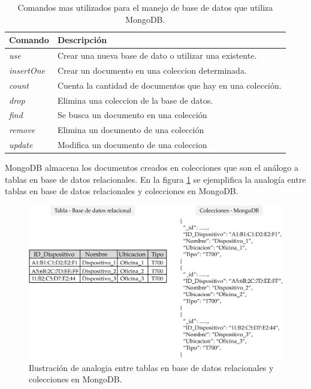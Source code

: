 \begin{table}[h]
	\centering
	\caption[Comandos utilizados en MongoDB]{Comandos mas utilizados para el manejo de base de datos que utiliza MongoDB.}
	\begin{tabular}{l l }    
		\toprule
		\textbf{Comando} 	 & \textbf{Descripción} 		\\
		\midrule
	
		\textit{use} 							& Crear una nueva base de dato o utilizar una existente.\\		
		\textit{insertOne}					& Crear un documento en una coleccion determinada.\\	
		\textit{count}						& Cuenta la cantidad de documentos que hay en una colección.\\	
		\textit{drop}							& Elimina una coleccion de la base de datos.\\	
		\textit{find	} 						& Se busca un documento en una colección\\
		\textit{remove}	 					& Elimina un documento de una colección\\
		\textit{update}						& Modifica un documento de una coleccion\\
		
		\bottomrule
		\hline
	\end{tabular}
	\label{tab:mongo-commands}
\end{table}

MongoDB almacena los documentos creados en colecciones que son el análogo a tablas en base de datos relacionales.  En la figura \ref{fig:tabla-coleccion} se ejemplifica la analogía entre tablas en base de datos relacionales y colecciones en MongoDB.

\begin{figure}[htpb]
	\centering
	\includegraphics[scale=.7]{./Figures/tabla-coleccion.png}
	\caption[Comparacion tabla - colecciones en MongoDB ]{Ilustración de analogia entre tablas en base de datos relacionales y colecciones en MongoDB.}
	\label{fig:tabla-coleccion}
\end{figure}




